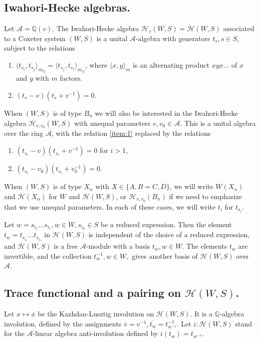 \documentclass[11pt,leqno]{article}
\theoremstyle{definition}
\theoremstyle{definition}
\theoremstyle{remark}
\newcommand{\He}{\mathcal{H}}
\begin{document}
\subsection{Iwahori-Hecke algebras.}
Let $\mathcal{A} = \mathbb{Q}(v)$. The Iwahori-Hecke algebra $\He_v(W,S) = \He(W,S)$ associated to a Coxeter system $(W,S)$ is a unital $\mathcal{A}$-algebra with generators $t_s, s \in S,$ subject to the relations
\begin{enumerate}[label=(\roman*).,ref=(\roman*)]
\item $\langle t_{s_i},t_{s_j}\rangle_{m_{ij}} = \langle t_{s_j},t_{s_i}\rangle_{m_{ij}}$, where $\langle x,y \rangle_{m}$ is an alternating product $xyx\dots$ of $x$ and $y$ with $m$ factors.
\item \label{item:1} $(t_s - v)(t_s + v^{-1}) = 0.$
\end{enumerate}
When $(W,S)$ is of type $B_n$ we will also be interested in the Iwahori-Hecke algebra $\He_{v,v_0}(W,S)$ with unequal parameters $v, v_0 \in \mathcal{A}$. This is a unital algebra over the ring $\mathcal{A}$, with the relation \ref{item:1} replaced by the relations
\begin{enumerate}[]
\item[(ii\textquotesingle).] $(t_{s_i} - v)(t_{s_i} + v^{-1}) = 0$ for $i > 1$,
\item[(ii\textquotesingle\textquotesingle).] $(t_{s_i} - v_0)(t_{s_i} + v_{0}^{-1}) = 0$.
\end{enumerate}


When $(W,S)$ is of type $X_n$ with $X \in \{A, B=C, D\}$, we will write $W(X_n)$ and $\He(X_n)$ for $W$ and $\He(W,S)$, or $\He_{v,v_0}(B_n)$ if we need to emphasize that we use unequal parameters. In each of these cases, we will write $t_i$ for $t_{s_i}$.

Let $w = s_{i_1}\dots s_{i_r}, w \in W, s_{i_k} \in S$ be a reduced expression. Then the element $t_w = t_{s_{i_1}}\dots t_{s_{i_r}}$ in $\He(W,S)$ is independent of the choice of a reduced expression, and $\He(W,S)$ is a free $\mathcal{A}$-module with a basis $t_w, w \in W$. The elements $t_w$ are invertible, and the collection $t_{w}^{-1}, w \in W,$ gives another basis of $\He(W,S)$ over $\mathcal{A}$. 

\subsection{Trace functional and a pairing on $\He(W,S)$.} Let $x \mapsto \overline{x}$ be the Kazhdan-Lusztig involution on $\He(W,S)$. It is a $\mathbb{Q}$-algebra involution, defined by the assignments $\overline{v} = v^{-1}, \overline{t_w} = t_{w^{-1}}^{-1}.$ Let $i:\He(W,S)$ stand for the $\mathcal{A}$-linear algebra anti-involution defined by $i(t_w) = t_{w^{-1}}$. 
\end{document}
